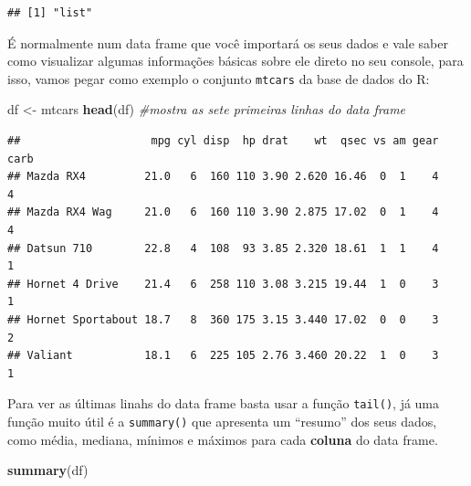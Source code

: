 \documentclass[]{book}
\newenvironment{Shaded}{\begin{snugshade}}{\end{snugshade}}
\newcommand{\KeywordTok}[1]{\textcolor[rgb]{0.13,0.29,0.53}{\textbf{#1}}}
\newcommand{\StringTok}[1]{\textcolor[rgb]{0.31,0.60,0.02}{#1}}
\newcommand{\CommentTok}[1]{\textcolor[rgb]{0.56,0.35,0.01}{\textit{#1}}}
\newcommand{\NormalTok}[1]{#1}
\theoremstyle{definition}
\theoremstyle{definition}
\theoremstyle{definition}
\theoremstyle{remark}
\begin{document}
\begin{verbatim}
## [1] "list"
\end{verbatim}

É normalmente num data frame que você importará os seus dados e vale
saber como visualizar algumas informações básicas sobre ele direto no
seu console, para isso, vamos pegar como exemplo o conjunto
\texttt{mtcars} da base de dados do R:

\begin{Shaded}
\begin{Highlighting}[]
\NormalTok{df <-}\StringTok{ }\NormalTok{mtcars}
\KeywordTok{head}\NormalTok{(df) }\CommentTok{#mostra as sete primeiras linhas do data frame}
\end{Highlighting}
\end{Shaded}

\begin{verbatim}
##                    mpg cyl disp  hp drat    wt  qsec vs am gear carb
## Mazda RX4         21.0   6  160 110 3.90 2.620 16.46  0  1    4    4
## Mazda RX4 Wag     21.0   6  160 110 3.90 2.875 17.02  0  1    4    4
## Datsun 710        22.8   4  108  93 3.85 2.320 18.61  1  1    4    1
## Hornet 4 Drive    21.4   6  258 110 3.08 3.215 19.44  1  0    3    1
## Hornet Sportabout 18.7   8  360 175 3.15 3.440 17.02  0  0    3    2
## Valiant           18.1   6  225 105 2.76 3.460 20.22  1  0    3    1
\end{verbatim}

Para ver as últimas linahs do data frame basta usar a função
\texttt{tail()}, já uma função muito útil é a \texttt{summary()} que
apresenta um ``resumo'' dos seus dados, como média, mediana, mínimos e
máximos para cada \textbf{coluna} do data frame.

\begin{Shaded}
\begin{Highlighting}[]
\KeywordTok{summary}\NormalTok{(df)}
\end{Highlighting}
\end{Shaded}
\end{document}
